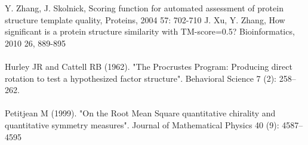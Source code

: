 \documentclass{article}
\begin{document}
Y. Zhang, J. Skolnick, Scoring function for automated assessment of protein structure template quality, Proteins, 2004 57: 702-710
J. Xu, Y. Zhang, How significant is a protein structure similarity with TM-score=0.5? Bioinformatics, 2010 26, 889-895\\\\

Hurley JR and Cattell RB (1962). "The Procrustes Program: Producing direct rotation to test a hypothesized factor structure". Behavioral Science 7 (2): 258–262.\\\\

Petitjean M (1999). "On the Root Mean Square quantitative chirality and quantitative symmetry measures". Journal of Mathematical Physics 40 (9): 4587–4595\\\\
\end{document}
